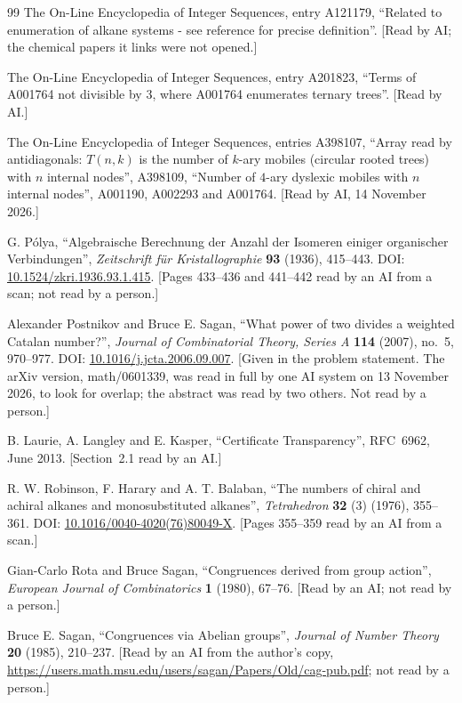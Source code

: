 \documentclass[11pt]{article}
\theoremstyle{definition}
\theoremstyle{remark}
\numberwithin{equation}{section}
\numberwithin{figure}{section}
\begin{document}
\begin{thebibliography}{99}
The On-Line Encyclopedia of Integer Sequences, entry A121179, ``Related to enumeration of alkane systems - see
reference for precise definition''. [Read by AI; the chemical papers it links were not opened.]

The On-Line Encyclopedia of Integer Sequences, entry A201823, ``Terms of A001764 not divisible by 3, where
A001764 enumerates ternary trees''. [Read by AI.]

The On-Line Encyclopedia of Integer Sequences, entries A398107, ``Array read by antidiagonals: $T(n,k)$ is
the number of $k$-ary mobiles (circular rooted trees) with $n$ internal nodes'', A398109, ``Number of $4$-ary
dyslexic mobiles with $n$ internal nodes'', A001190, A002293 and A001764. [Read by AI, 14 November 2026.]

G. P\'olya, ``Algebraische Berechnung der Anzahl der Isomeren einiger organischer Verbindungen'',
\emph{Zeitschrift f\"ur Kristallographie} \textbf{93} (1936), 415--443. DOI:
\href{https://doi.org/10.1524/zkri.1936.93.1.415}{10.1524/zkri.1936.93.1.415}. [Pages 433--436 and 441--442
read by an AI from a scan; not read by a person.]

Alexander Postnikov and Bruce E. Sagan, ``What power of two divides a weighted Catalan number?'',
\emph{Journal of Combinatorial Theory, Series A} \textbf{114} (2007), no.~5, 970--977. DOI:
\href{https://doi.org/10.1016/j.jcta.2006.09.007}{10.1016/j.jcta.2006.09.007}. [Given in the problem
statement. The arXiv version, math/0601339, was read in full by one AI system on 13 November 2026, to look
for overlap; the abstract was read by two others. Not read by a person.]

B. Laurie, A. Langley and E. Kasper, ``Certificate Transparency'', RFC~6962, June 2013. [Section~2.1 read by
an AI.]

R. W. Robinson, F. Harary and A. T. Balaban, ``The numbers of chiral and achiral alkanes and monosubstituted
alkanes'', \emph{Tetrahedron} \textbf{32} (3) (1976), 355--361. DOI:
\href{https://doi.org/10.1016/0040-4020(76)80049-X}{10.1016/0040-4020(76)80049-X}. [Pages 355--359 read by an
AI from a scan.]

Gian-Carlo Rota and Bruce Sagan, ``Congruences derived from group action'', \emph{European Journal of
Combinatorics} \textbf{1} (1980), 67--76. [Read by an AI; not read by a person.]

Bruce E. Sagan, ``Congruences via Abelian groups'', \emph{Journal of Number Theory} \textbf{20} (1985),
210--237. [Read by an AI from the author's copy,
\url{https://users.math.msu.edu/users/sagan/Papers/Old/cag-pub.pdf}; not read by a person.]


\end{thebibliography}
\end{document}
